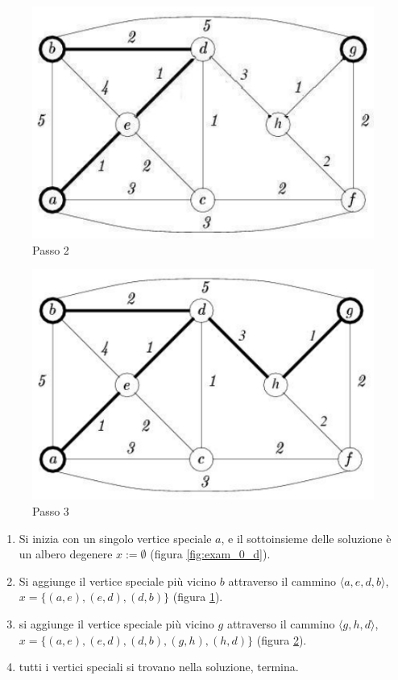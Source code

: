 \documentclass{article}
\begin{document}
    \begin{figure}[H]
        \centering
        \includegraphics[scale=0.5 ]{images/examp1.png}
        \caption{Passo 2}
        \label{fig:exam_1_d}
    \end{figure}

    \begin{figure}[H]
        \centering
        \includegraphics[scale=0.5 ]{images/examp2.png}
        \caption{Passo 3}
        \label{fig:exam_2_d}
    \end{figure}

    \begin{enumerate}
        \item Si inizia con un singolo vertice speciale $a$, e il sottoinsieme delle soluzione è
              un albero degenere $x:=\emptyset$ (figura \ref{fig:exam_0_d}).
        \item Si aggiunge il vertice speciale più vicino $b$ attraverso il cammino $\langle a,e,d,b\rangle$,
              $x=\{(a,e),(e,d),(d,b)\}$ (figura \ref{fig:exam_1_d}).
        \item si aggiunge il vertice speciale più vicino $g$ attraverso il cammino $\langle g,h,d\rangle$,
              $x=\{(a,e),(e,d),(d,b),(g,h),(h,d)\}$ (figura \ref{fig:exam_2_d}).
        \item tutti i vertici speciali si trovano nella soluzione, termina.
    \end{enumerate}
\end{document}
